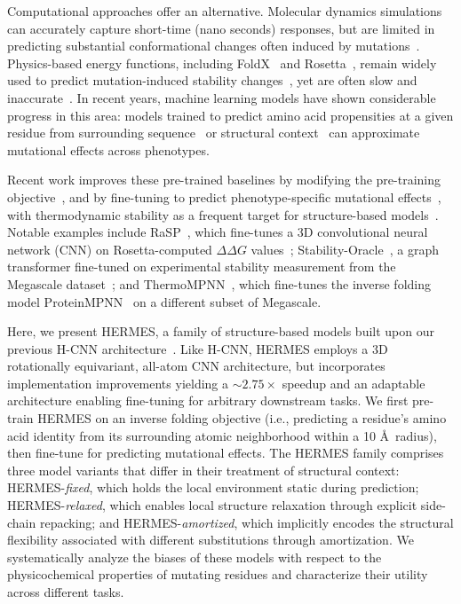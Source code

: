 Computational approaches offer an alternative. Molecular dynamics simulations can accurately capture
short-time (nano seconds) responses, but are limited in predicting substantial conformational
changes often induced by mutations~\citep{gapsys_accurate_2016}. Physics-based energy functions,
including FoldX~\citep{schymkowitz_foldx_2005} and Rosetta~\citep{kellogg_role_2011}, remain widely
used to predict mutation-induced stability changes~\citep{gonzalez_general_2024}, yet are often slow
and inaccurate~\citep{blaabjerg_rapid_2023}. In recent years, machine learning models have shown
considerable progress in this area: models trained to predict amino acid propensities at a given
residue from surrounding sequence~\citep{riesselman_deep_2018, meier_language_2021} or structural
context~\citep{pun_learning_2024, diaz_stability_2024, blaabjerg_rapid_2023,
li_predicting_2020,benevenuta_antisymmetric_2021, dieckhaus_transfer_2024} can approximate
mutational effects across phenotypes.

Recent work improves these pre-trained baselines by modifying the pre-training
objective~\citep{gordon_protein_2024,gong_evolution-inspired_2024}, and by fine-tuning to predict
phenotype-specific mutational effects~\citep{dieckhaus_transfer_2024, diaz_stability_2024,
blaabjerg_rapid_2023, luo_rotamer_2022}, with thermodynamic stability as a frequent target for
structure-based models~\citep{dieckhaus_transfer_2024, diaz_stability_2024, blaabjerg_rapid_2023}.
Notable examples include RaSP~\citep{blaabjerg_rapid_2023}, which fine-tunes a 3D convolutional
neural network (CNN) on Rosetta-computed $\Delta\Delta G$ values~\citep{chaudhury_pyrosetta_2010};
Stability-Oracle~\citep{diaz_stability_2024}, a graph transformer fine-tuned on experimental
stability measurement from the Megascale dataset~\citep{tsuboyama_mega-scale_2023}; and
ThermoMPNN~\citep{dieckhaus_transfer_2024}, which fine-tunes the inverse folding model
ProteinMPNN~\citep{dauparas_robust_2022} on a different subset of Megascale.

Here, we present HERMES, a family of structure-based models built upon our previous H-CNN
architecture~\citep{pun_learning_2024}. Like H-CNN, HERMES employs a 3D rotationally equivariant,
all-atom CNN architecture, but incorporates implementation improvements yielding a $\sim 2.75\times$
speedup and an adaptable architecture enabling fine-tuning for arbitrary downstream tasks. We first
pre-train HERMES on an inverse folding objective (i.e., predicting a residue's amino acid identity
from its surrounding atomic neighborhood within a 10 \AA~radius), then fine-tune for predicting
mutational effects. The HERMES family comprises three model variants that differ in their treatment
of structural context: HERMES-{\em fixed}, which holds the local environment static during
prediction; HERMES-{\em relaxed}, which enables local structure relaxation through explicit
side-chain repacking; and HERMES-{\em amortized}, which implicitly encodes the structural
flexibility associated with different substitutions through amortization. We systematically analyze
the biases of these models with respect to the physicochemical properties of mutating residues and
characterize their utility across different tasks.

